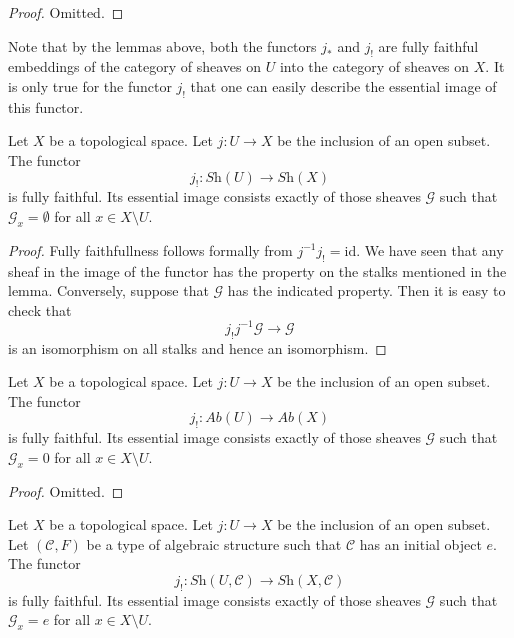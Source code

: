 \begin{proof}
Omitted.
\end{proof}

\noindent
Note that by the lemmas above, both the functors
$j_*$ and $j_!$ are fully faithful embeddings of
the category of sheaves on $U$ into the category
of sheaves on $X$. It is only true for the functor
$j_!$ that one can easily describe the essential
image of this functor.

\begin{lemma}
\label{lemma-equivalence-categories-open}
Let $X$ be a topological space.
Let $j : U \to X$ be the inclusion of an open subset.
The functor
$$
j_! : \textit{Sh}(U) \longrightarrow \textit{Sh}(X)
$$
is fully faithful. Its essential image consists exactly
of those sheaves $\mathcal{G}$ such that
$\mathcal{G}_x = \emptyset$ for all $x \in X \setminus U$.
\end{lemma}

\begin{proof}
Fully faithfullness follows formally from $j^{-1} j_! = \text{id}$.
We have seen that any sheaf in the image of the functor has
the property on the stalks mentioned in the lemma. Conversely, suppose
that $\mathcal{G}$ has the indicated property.
Then it is easy to check that
$$
j_! j^{-1} \mathcal{G} \to \mathcal{G}
$$
is an isomorphism on all stalks and hence an isomorphism.
\end{proof}

\begin{lemma}
\label{lemma-equivalence-categories-open-abelian}
Let $X$ be a topological space.
Let $j : U \to X$ be the inclusion of an open subset.
The functor
$$
j_! : \textit{Ab}(U) \longrightarrow \textit{Ab}(X)
$$
is fully faithful. Its essential image consists exactly
of those sheaves $\mathcal{G}$ such that
$\mathcal{G}_x = 0$ for all $x \in X \setminus U$.
\end{lemma}

\begin{proof}
Omitted.
\end{proof}

\begin{lemma}
\label{lemma-equivalence-categories-open-structures}
Let $X$ be a topological space.
Let $j : U \to X$ be the inclusion of an open subset.
Let $(\mathcal{C}, F)$ be a type of algebraic structure
such that $\mathcal{C}$ has an initial object $e$.
The functor
$$
j_! : \textit{Sh}(U, \mathcal{C}) \longrightarrow \textit{Sh}(X, \mathcal{C})
$$
is fully faithful. Its essential image consists exactly
of those sheaves $\mathcal{G}$ such that
$\mathcal{G}_x = e$ for all $x \in X \setminus U$.
\end{lemma}

